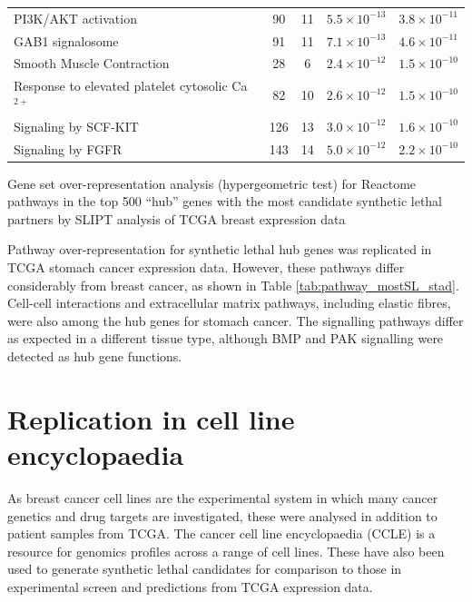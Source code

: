 \begin{table}[!ht]
{\begin{threeparttable}
\begin{tabular}{lcccc}
  \rowcolor{black!10}
  PI3K/AKT activation &  90 &  11 & $5.5 \times 10^{-13}$ & $3.8 \times 10^{-11}$ \\ 
  \rowcolor{black!5}
  GAB1 signalosome &  91 &  11 & $7.1 \times 10^{-13}$ & $4.6 \times 10^{-11}$ \\ 
  \rowcolor{black!10}
  Smooth Muscle Contraction &  28 &   6 & $2.4 \times 10^{-12}$ & $1.5 \times 10^{-10}$ \\ 
  \rowcolor{black!5}
  Response to elevated platelet cytosolic Ca$^{2+}$ &  82 &  10 & $2.6 \times 10^{-12}$ & $1.5 \times 10^{-10}$ \\ 
  \rowcolor{black!10}
  Signaling by SCF-KIT & 126 &  13 & $3.0 \times 10^{-12}$ & $1.6 \times 10^{-10}$ \\ 
  \rowcolor{black!5}
  Signaling by FGFR & 143 &  14 & $5.0 \times 10^{-12}$ & $2.2 \times 10^{-10}$ \\ 
   \hline
\end{tabular}
\begin{tablenotes}
\raggedright \small
Gene set over-representation analysis (hypergeometric test) for Reactome pathways in the top 500 ``hub'' genes with the most candidate synthetic lethal partners by SLIPT analysis of TCGA breast expression data
\end{tablenotes}
\end{threeparttable}
}
\end{table}

Pathway over-representation for synthetic lethal hub genes was replicated in TCGA stomach cancer expression data. However, these pathways differ considerably from breast cancer, as shown in Table \ref{tab:pathway_mostSL_stad}. Cell-cell interactions and extracellular matrix pathways, including elastic fibres, were also among the hub genes for stomach cancer. The signalling pathways differ as expected in a different tissue type, although BMP and PAK signalling were detected as hub gene functions.

\FloatBarrier

\section{Replication in cell line encyclopaedia} \label{chapt3:CCLE}

As breast cancer cell lines are the experimental system in which many cancer genetics and drug targets are investigated, these were analysed in addition to patient samples from TCGA. The cancer cell line encyclopaedia (CCLE) is a resource for genomics profiles across a range of cell lines. These have also been used to generate synthetic lethal candidates for comparison to those in experimental screen and predictions from TCGA expression data.


